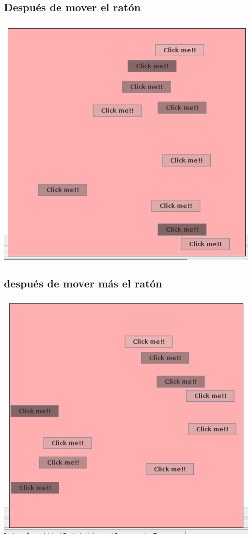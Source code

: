 \documentclass[12pt]{article}
\begin{document}
\subsection*{Después de mover el ratón}

\includegraphics[width=\textwidth]{Ejecucion1.png}

\subsection*{después de mover más el ratón}

\includegraphics[width=\textwidth]{Ejecucion2.png}
\end{document}
